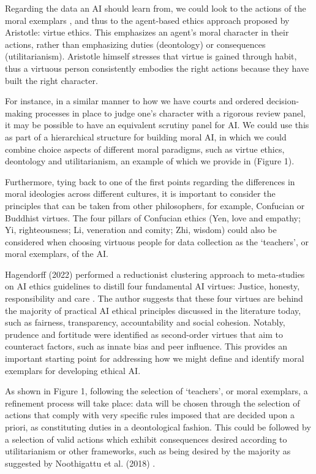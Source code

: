 \documentclass[10pt]{article}
\begin{document}
Regarding the data an AI should learn from, we could look to the actions of the moral exemplars \textsuperscript{\cite{hindocha_moral_2022}}, and thus to the agent-based ethics approach proposed by Aristotle: virtue ethics. This emphasizes an agent’s moral character in their actions, rather than emphasizing duties (deontology) or consequences (utilitarianism). Aristotle himself stresses that virtue is gained through habit, thus a virtuous person consistently embodies the right actions because they have built the right character. 

For instance, in a similar manner to how we have courts and ordered decision-making processes in place to judge one’s character with a rigorous review panel, it may be possible to have an equivalent scrutiny panel for AI. We could use this as part of a hierarchical structure for building moral AI, in which we could combine choice aspects of different moral paradigms, such as virtue ethics, deontology and utilitarianism, an example of which we provide in (Figure 1). 

Furthermore, tying back to one of the first points regarding the differences in moral ideologies across different cultures, it is important to consider the principles that can be taken from other philosophers, for example, Confucian or Buddhist virtues. The four pillars of Confucian ethics (Yen, love and empathy; Yi, righteousness; Li, veneration and comity; Zhi, wisdom) could also be considered when choosing virtuous people for data collection as the ‘teachers’, or moral exemplars, of the AI.

Hagendorff (2022) performed a reductionist clustering approach to meta-studies on AI ethics guidelines to distill four fundamental AI virtues: Justice, honesty, responsibility and care \textsuperscript{\cite{hagendorff_virtue-based_2022}}. The author suggests that these four virtues are behind the majority of practical AI ethical principles discussed in the literature today, such as fairness, transparency, accountability and social cohesion. Notably, prudence and fortitude were identified as second-order virtues that aim to counteract factors, such as innate bias and peer influence. This provides an important starting point for addressing how we might define and identify moral exemplars for developing ethical AI.

As shown in Figure 1, following the selection of ‘teachers’, or moral exemplars, a refinement process will take place: data will be chosen through the selection of actions that comply with very specific rules imposed that are decided upon a priori, as constituting duties in a deontological fashion. This could be followed by a selection of valid actions which exhibit consequences desired according to utilitarianism or other frameworks, such as being desired by the majority as suggested by Noothigattu et al. (2018) \textsuperscript{\cite{noothigattu_voting-based_2018}}.
\end{document}
